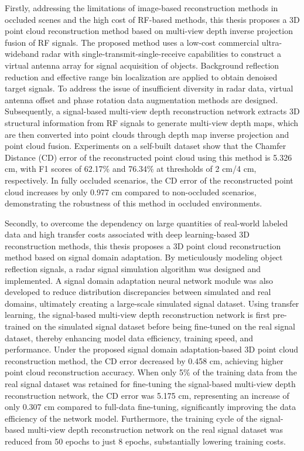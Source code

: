 \begin{englishabstract}
    Firstly, addressing the limitations of image-based reconstruction methods in occluded scenes and the high cost of RF-based methods, this thesis proposes a 3D point cloud reconstruction method based on multi-view depth inverse projection fusion of RF signals. The proposed method uses a low-cost commercial ultra-wideband radar with single-transmit-single-receive capabilities to construct a virtual antenna array for signal acquisition of objects. Background reflection reduction and effective range bin localization are applied to obtain denoised target signals. To address the issue of insufficient diversity in radar data, virtual antenna offset and phase rotation data augmentation methods are designed. Subsequently, a signal-based multi-view depth reconstruction network extracts 3D structural information from RF signals to generate multi-view depth maps, which are then converted into point clouds through depth map inverse projection and point cloud fusion. Experiments on a self-built dataset show that the Chamfer Distance (CD) error of the reconstructed point cloud using this method is 5.326 cm, with F1 scores of 62.17\% and 76.34\% at thresholds of 2 cm/4 cm, respectively. In fully occluded scenarios, the CD error of the reconstructed point cloud increases by only 0.977 cm compared to non-occluded scenarios, demonstrating the robustness of this method in occluded environments.
    
    Secondly, to overcome the dependency on large quantities of real-world labeled data and high transfer costs associated with deep learning-based 3D reconstruction methods, this thesis proposes a 3D point cloud reconstruction method based on signal domain adaptation. By meticulously modeling object reflection signals, a radar signal simulation algorithm was designed and implemented. A signal domain adaptation neural network module was also developed to reduce distribution discrepancies between simulated and real domains, ultimately creating a large-scale simulated signal dataset. Using transfer learning, the signal-based multi-view depth reconstruction network is first pre-trained on the simulated signal dataset before being fine-tuned on the real signal dataset, thereby enhancing model data efficiency, training speed, and performance. Under the proposed signal domain adaptation-based 3D point cloud reconstruction method, the CD error decreased by 0.458 cm, achieving higher point cloud reconstruction accuracy. When only 5\% of the training data from the real signal dataset was retained for fine-tuning the signal-based multi-view depth reconstruction network, the CD error was 5.175 cm, representing an increase of only 0.307 cm compared to full-data fine-tuning, significantly improving the data efficiency of the network model. Furthermore, the training cycle of the signal-based multi-view depth reconstruction network on the real signal dataset was reduced from 50 epochs to just 8 epochs, substantially lowering training costs.

\end{englishabstract}